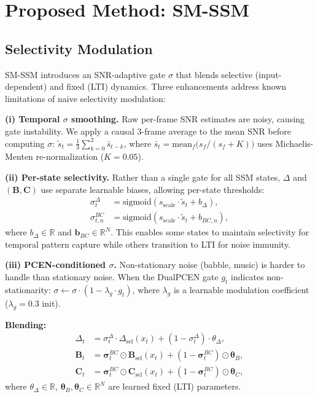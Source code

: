 \documentclass{Interspeech}
\begin{document}
\section{Proposed Method: SM-SSM}
\label{sec:smssm}

\subsection{Selectivity Modulation}

SM-SSM introduces an SNR-adaptive gate $\sigma$ that blends selective (input-dependent) and fixed (LTI) dynamics.
Three enhancements address known limitations of naive selectivity modulation:

\smallskip\noindent\textbf{(i) Temporal $\sigma$ smoothing.}
Raw per-frame SNR estimates are noisy, causing gate instability.
We apply a causal 3-frame average to the mean SNR before computing $\sigma$:
$\tilde{s}_t = \frac{1}{3}\sum_{k=0}^{2} \bar{s}_{t-k}$, where $\bar{s}_t = \text{mean}_f\big(s_f/(s_f{+}K)\big)$ uses Michaelis-Menten re-normalization ($K{=}0.05$).

\smallskip\noindent\textbf{(ii) Per-state selectivity.}
Rather than a single gate for all SSM states, $\Delta$ and $(\mathbf{B}, \mathbf{C})$ use separate learnable biases, allowing per-state thresholds:
\begin{align}
\sigma^\Delta_t &= \text{sigmoid}(s_{\text{scale}} \cdot \tilde{s}_t + b_\Delta), \label{eq:sigma_dt} \\
\sigma^{BC}_{t,n} &= \text{sigmoid}(s_{\text{scale}} \cdot \tilde{s}_t + b_{BC,n}), \label{eq:sigma_bc}
\end{align}
where $b_\Delta \in \mathbb{R}$ and $\mathbf{b}_{BC} \in \mathbb{R}^N$.
This enables some states to maintain selectivity for temporal pattern capture while others transition to LTI for noise immunity.

\smallskip\noindent\textbf{(iii) PCEN-conditioned $\sigma$.}
Non-stationary noise (babble, music) is harder to handle than stationary noise.
When the DualPCEN gate $g_t$ indicates non-stationarity:
$\sigma \leftarrow \sigma \cdot (1 - \lambda_g \cdot g_t)$,
where $\lambda_g$ is a learnable modulation coefficient ($\lambda_g{=}0.3$ init).

\smallskip\noindent\textbf{Blending:}
\begin{align}
\Delta_t &= \sigma^\Delta_t \cdot \Delta_{\text{sel}}(x_t) + (1{-}\sigma^\Delta_t) \cdot \theta_\Delta, \label{eq:blend_dt} \\
\mathbf{B}_t &= \bm{\sigma}^{BC}_t \odot \mathbf{B}_{\text{sel}}(x_t) + (1{-}\bm{\sigma}^{BC}_t) \odot \bm{\theta}_B, \label{eq:blend_b} \\
\mathbf{C}_t &= \bm{\sigma}^{BC}_t \odot \mathbf{C}_{\text{sel}}(x_t) + (1{-}\bm{\sigma}^{BC}_t) \odot \bm{\theta}_C, \label{eq:blend_c}
\end{align}
where $\theta_\Delta \in \mathbb{R}$, $\bm{\theta}_B, \bm{\theta}_C \in \mathbb{R}^N$ are learned fixed (LTI) parameters.
\end{document}
